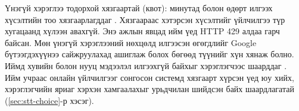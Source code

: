 Үнэгүй хэрэглээ тодорхой хязгаартай (квот): минутад болон өдөрт илгээх хүсэлтийн тоо хязгаарлагддаг \cite{google_rate_limits}. Хязгаараас хэтэрсэн хүсэлтийг үйлчилгээ түр хугацаанд хүлээн авахгүй. Энэ ажлын явцад ийм үед HTTP 429 алдаа гарч байсан. Мөн үнэгүй хэрэглээний нөхцөлд илгээсэн өгөгдлийг Google бүтээгдэхүүнээ сайжруулахад ашиглаж болох бөгөөд түүнийг хүн хянаж болно. Иймд хувийн болон нууц мэдээлэл илгээхгүй байхыг хэрэглэгчээс шаарддаг \cite{google_terms}. Ийм учраас онлайн үйлчилгээг сонгосон системд хязгаарт хүрсэн үед юу хийх, хэрэглэгчийн яриаг хэрхэн хамгаалахыг урьдчилан шийдсэн байх шаардлагатай (\ref{sec:stt-choice}-р хэсэг).
